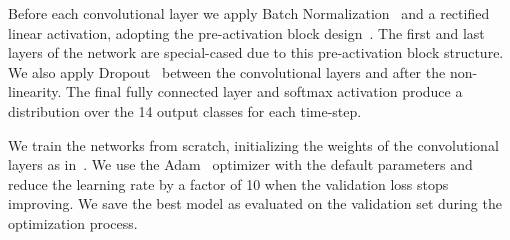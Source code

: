 Before each convolutional layer we apply Batch
Normalization~\cite{ioffe2015batch} and a rectified linear activation, adopting
the pre-activation block design~\cite{he2016deep}. The first and last layers of
the network are special-cased due to this pre-activation block structure. We
also apply Dropout~\cite{srivastava2014dropout} between the convolutional
layers and after the non-linearity. The final fully connected layer and softmax
activation produce a distribution over the 14 output classes for each
time-step.

We train the networks from scratch, initializing the weights of the
convolutional layers as in~\cite{he2015delving}. We use the
Adam~\cite{kingma2014adam} optimizer with the default parameters and reduce the
learning rate by a factor of 10 when the validation loss stops improving. We
save the best model as evaluated on the validation set during the optimization
process.
